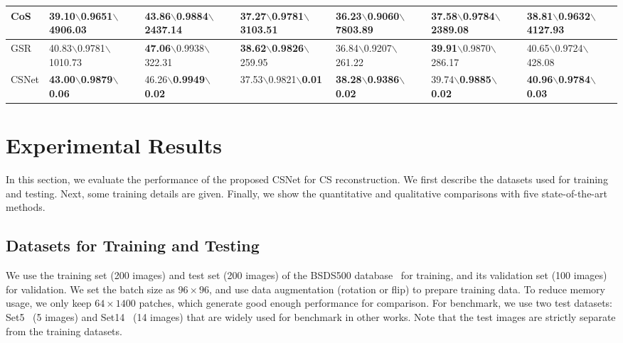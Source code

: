 \documentclass[5pt]{article}
\begin{document}
\begin{table*}[t]
\begin{tabular}{|l|l|l|l|l|l|l|}
\hline
CoS & 39.10$\backslash$0.9651$\backslash$\tiny 4906.03 & 43.86$\backslash$0.9884$\backslash$\tiny 2437.14 & 37.27$\backslash$0.9781$\backslash$\tiny 3103.51 & 36.23$\backslash$0.9060$\backslash$\tiny 7803.89 & 37.58$\backslash$0.9784$\backslash$\tiny 2389.08 & 38.81$\backslash$0.9632$\backslash$\tiny 4127.93\\
\hline
GSR & 40.83$\backslash$0.9781$\backslash$\tiny 1010.73 & \textbf{47.06}$\backslash$0.9938$\backslash$322.31 & \textbf{38.62}$\backslash$\textbf{0.9826}$\backslash$259.95 & 36.84$\backslash$0.9207$\backslash$261.22 & \textbf{39.91}$\backslash$0.9870$\backslash$286.17 & 40.65$\backslash$0.9724$\backslash$428.08\\
\hline
CSNet & \textbf{43.00}$\backslash$\textbf{0.9879}$\backslash$\textbf{0.06} & 46.26$\backslash$\textbf{0.9949}$\backslash$\textbf{0.02} & 37.53$\backslash$0.9821$\backslash$\textbf{0.01} & \textbf{38.28}$\backslash$\textbf{0.9386}$\backslash$\textbf{0.02} & 39.74$\backslash$\textbf{0.9885}$\backslash$\textbf{0.02} & \textbf{40.96}$\backslash$\textbf{0.9784}$\backslash$\textbf{0.03}\\\hline
\end{tabular}
\vspace{-15pt}
\end{table*}

\section{Experimental Results}

In this section, we evaluate the performance of the proposed CSNet for CS reconstruction. We first describe the datasets used for training and testing. Next, some training details are given. Finally, we show the quantitative and qualitative comparisons with five state-of-the-art methods.

\subsection{Datasets for Training and Testing}

We use the training set (200 images) and test set (200 images) of the BSDS500 database~\cite{rf22} for training, and its validation set (100 images) for validation. We set the batch size as $96 \times 96$, and use data augmentation (rotation or flip) to prepare training data. To reduce memory usage, we only keep $64 \times 1400$ patches, which generate good enough performance for comparison. For benchmark, we use two test datasets: Set5~\cite{rf23} (5 images) and Set14~\cite{rf24} (14 images) that are widely used for benchmark in other works. Note that the test images are strictly separate from the training datasets.
\end{document}
